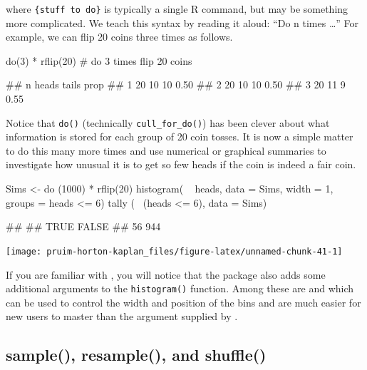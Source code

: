 \noindent
where \texttt{\{stuff\ to\ do\}} is typically a single R command, but
may be something more complicated. We teach this syntax by reading it
aloud: ``Do n times \ldots{}'' For example, we can flip 20 coins three
times as follows.

\begin{Schunk}
\begin{Sinput}
do(3) * rflip(20)   # do 3 times flip 20 coins
\end{Sinput}
\begin{Soutput}
##    n heads tails prop
## 1 20    10    10 0.50
## 2 20    10    10 0.50
## 3 20    11     9 0.55
\end{Soutput}
\end{Schunk}

\noindent
Notice that \texttt{do()} (technically \texttt{cull\_for\_do()}) has
been clever about what information is stored for each group of 20 coin
tosses. It is now a simple matter to do this many more times and use
numerical or graphical summaries to investigate how unusual it is to get
so few heads if the coin is indeed a fair coin.

\begin{Schunk}
\begin{Sinput}
Sims <- do (1000) * rflip(20)
histogram( ~ heads, data = Sims, width = 1, groups = heads <= 6)
tally ( ~(heads <= 6), data = Sims)
\end{Sinput}
\begin{Soutput}
## 
##  TRUE FALSE 
##    56   944
\end{Soutput}


\begin{center}\texttt{[image: pruim-horton-kaplan\_files/figure-latex/unnamed-chunk-41-1]} \end{center}

\end{Schunk}

\noindent
If you are familiar with , you will notice that the
 package also adds some additional arguments to the
\texttt{histogram()} function. Among these are  and
 which can be used to control the width and position of the
bins and are much easier for new users to master than the 
argument supplied by .

\subsection{sample(), resample(), and
shuffle()}\label{sample-resample-and-shuffle}

